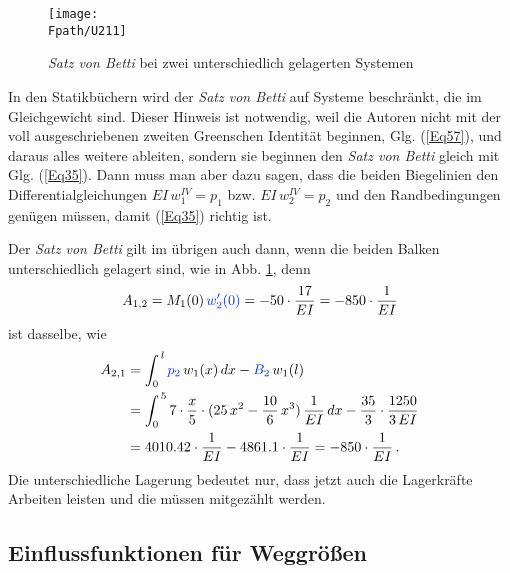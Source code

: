 \begin{figure}[tbp]
\centering
\if {} \sidecaption \fi
\texttt{[image: \\Fpath/U211]}
\caption{{\em Satz von Betti\/} bei zwei unterschiedlich gelagerten Systemen} \label{U211}
%
\end{figure}%

In den Statikb\"{u}chern wird der {\em Satz von Betti\/} auf Systeme beschr\"{a}nkt, die im Gleichgewicht sind. Dieser Hinweis ist notwendig, weil die Autoren nicht mit der voll ausgeschriebenen zweiten Greenschen Identit\"{a}t beginnen, Glg. (\ref{Eq57}), und daraus alles weitere ableiten, sondern sie  beginnen den {\em Satz von Betti\/} gleich mit Glg. (\ref{Eq35}). Dann muss man aber dazu sagen, dass die beiden Biegelinien den Differentialgleichungen $EI\,w_1^{IV} = p_1$ bzw. $EI\,w_2^{IV} = p_2$ und den Randbedingungen gen\"{u}gen m\"{u}ssen, damit (\ref{Eq35}) richtig ist.

Der {\em Satz von Betti\/} gilt im \"{u}brigen auch dann, wenn die beiden Balken unterschiedlich gelagert sind, wie in Abb. \ref{U211}, denn
\begin{align}
A_{1,2} = M_1(0)\,\textcolor{chapterTitleBlue}{w_2'(0)} = - 50 \cdot \frac{17}{EI}= - 850\cdot\frac{1}{EI}
\end{align}
ist dasselbe, wie
\begin{align}
A_{2,1} &=   \int_0^{\,l} \textcolor{chapterTitleBlue}{p_2}\,w_1(x)\,dx - \textcolor{chapterTitleBlue}{B_2}\,w_1(l)\nn \\
&= \int_0^{\,5} 7 \cdot \frac{x}{5} \cdot ( 25\,x^2 - \frac{10}{6}\,x^3)\,\frac{1}{EI}\,dx  - \frac{35}{3} \cdot \frac{1250}{3\,EI}\nn \\
&=  4010.42  \cdot\frac{1}{EI} - 4861.1\cdot\frac{1}{EI} = - 850\cdot\frac{1}{EI}\,.
\end{align}
Die unterschiedliche Lagerung bedeutet nur, dass jetzt auch die Lagerkr\"{a}fte Arbeiten leisten und die m\"{u}ssen mitgez\"{a}hlt werden.

{\textcolor{sectionTitleBlue}{\section{Einflussfunktionen f\"{u}r Weggr\"{o}{\ss}en}}}

